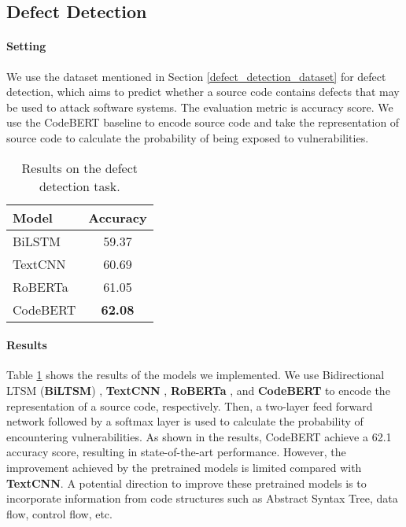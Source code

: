 \documentclass[sigconf,nonacm,screen]{acmart}
\begin{document}
\subsection{Defect Detection}
\paragraph{Setting} We use the dataset mentioned in Section \ref{defect_detection_dataset} for defect detection, which aims to predict whether a source code contains defects that may be used to attack software systems. The  evaluation metric is accuracy score. We use the CodeBERT baseline to encode source code and take the representation of source code to calculate the probability of being exposed to vulnerabilities. 
\begin{table}[h]
\centering
\caption{Results on the defect detection task.}
\label{table-code-defect-detection}
\begin{tabular}{lc}
\toprule
    Model&Accuracy\\
    \midrule 
    BiLSTM&59.37\\
    TextCNN&60.69\\
    RoBERTa&61.05\\
    CodeBERT&\bf{62.08}\\
	\bottomrule 
\end{tabular}
\end{table}

\paragraph{Results} Table \ref{table-code-defect-detection} shows the results of the models we implemented. We use Bidirectional LTSM (\textbf{BiLTSM})  \cite{hochreiter1997long}, \textbf{TextCNN} \cite{kim2014convolutional}, \textbf{RoBERTa} \cite{liu2019roberta}, and \textbf{CodeBERT} \cite{feng2020codebert} to encode the representation of a source code, respectively. Then, a two-layer feed forward network followed by a softmax layer is used to calculate the probability of encountering vulnerabilities. 
As shown in the results, CodeBERT achieve a 62.1 accuracy score, resulting in state-of-the-art performance. However, the improvement achieved by the pretrained models is limited compared with \textbf{TextCNN}. A potential direction to improve these pretrained models is to incorporate information from code structures such as Abstract Syntax Tree, data flow, control flow, etc. 
\end{document}
